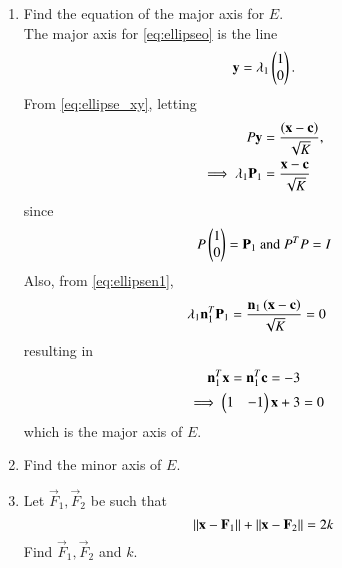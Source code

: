 \documentclass[journal,12pt,twocolumn]{IEEEtran}
\renewcommand\thesection{\arabic{section}}
\begin{document}
\begin{enumerate}[label=\thesection.\arabic*
,ref=\thesection.\theenumi]
\item Find the equation of the major axis for $E$.
\\
\solution  The major axis for \eqref{eq:ellipseo} is the line
\begin{equation}
\mathbf{y} = \lambda_1\begin{pmatrix}1 \\ 0\end{pmatrix}.
\end{equation}
From \eqref{eq:ellipse_xy}, letting
\begin{align}
P\mathbf{y}&= \frac{\left(\mathbf{x}-\mathbf{c}\right)}{\sqrt{K}},
\\ 
\implies  \lambda_1\mathbf{P}_1&= \frac{\mathbf{x}-\mathbf{c}}{\sqrt{K}}
\end{align}
%
since 
\begin{align}
P\begin{pmatrix}1 \\ 0\end{pmatrix}=\mathbf{P}_1\text{ and }P^{T}P = I
\end{align}
Also, from \eqref{eq:ellipsen1},
\begin{align}
\lambda_1\mathbf{n}_1^T\mathbf{P}_1&= \frac{\mathbf{n}_1\left(\mathbf{x}-\mathbf{c}\right)}{\sqrt{K}}=0
\end{align}
%
resulting in
\begin{align}
\mathbf{n}_1^T\mathbf{x}=\mathbf{n}_1^T\mathbf{c}= -3
\\
\implies\begin{pmatrix}1 & -1\end{pmatrix}\mathbf{x}+3&=0
\end{align}
%
which is the major axis of $E$.
\item Find the minor axis of $E$.
%
\item Let $\vec{F}_1,\vec{F}_2$ be such that
\begin{equation}
\lVert\mathbf{x}-\mathbf{F}_1\rVert
+\lVert\mathbf{x}-\mathbf{F}_2\rVert =2k
\end{equation}
Find $\vec{F}_1, \vec{F}_2$ and $k$.
\end{enumerate}
\end{document}

